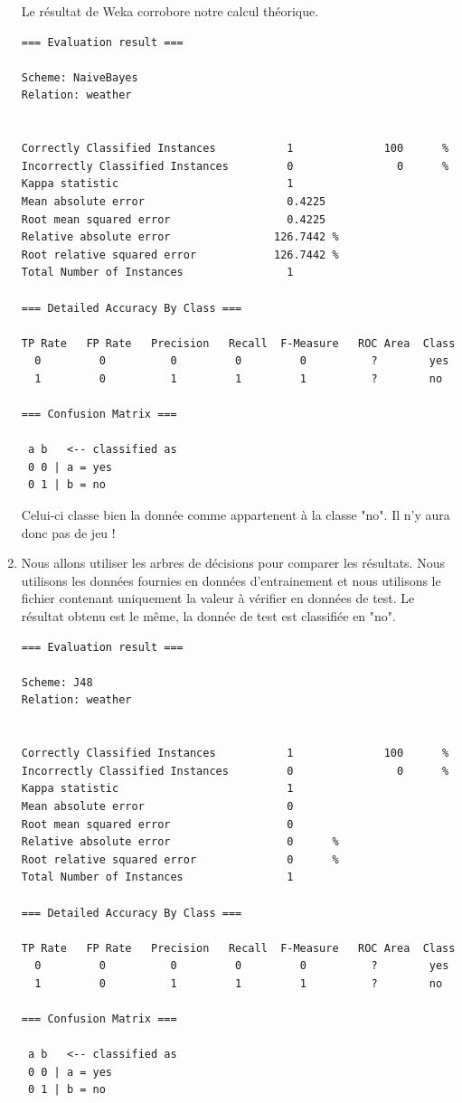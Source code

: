 \documentclass[a4paper]{article}
\begin{document}
\begin{enumerate}
Le résultat de Weka corrobore notre calcul théorique. 

\begin{lstlisting}[frame=single]
=== Evaluation result ===

Scheme: NaiveBayes
Relation: weather


Correctly Classified Instances           1              100      %
Incorrectly Classified Instances         0                0      %
Kappa statistic                          1     
Mean absolute error                      0.4225
Root mean squared error                  0.4225
Relative absolute error                126.7442 %
Root relative squared error            126.7442 %
Total Number of Instances                1     

=== Detailed Accuracy By Class ===

TP Rate   FP Rate   Precision   Recall  F-Measure   ROC Area  Class
  0         0          0         0         0          ?        yes
  1         0          1         1         1          ?        no

=== Confusion Matrix ===

 a b   <-- classified as
 0 0 | a = yes
 0 1 | b = no
\end{lstlisting}

Celui-ci classe bien la donnée comme appartenent à la classe "no". Il n'y aura donc pas de jeu !

\item Nous allons utiliser les arbres de décisions pour comparer les résultats. Nous utilisons les données fournies en données d'entrainement et nous utilisons le fichier contenant uniquement la valeur à vérifier en données de test. Le résultat obtenu est le même, la donnée de test est classifiée en "no".

\begin{lstlisting}[frame=single]
=== Evaluation result ===

Scheme: J48
Relation: weather


Correctly Classified Instances           1              100      %
Incorrectly Classified Instances         0                0      %
Kappa statistic                          1     
Mean absolute error                      0     
Root mean squared error                  0     
Relative absolute error                  0      %
Root relative squared error              0      %
Total Number of Instances                1     

=== Detailed Accuracy By Class ===

TP Rate   FP Rate   Precision   Recall  F-Measure   ROC Area  Class
  0         0          0         0         0          ?        yes
  1         0          1         1         1          ?        no

=== Confusion Matrix ===

 a b   <-- classified as
 0 0 | a = yes
 0 1 | b = no
\end{lstlisting}

\end{enumerate}
\end{document}
